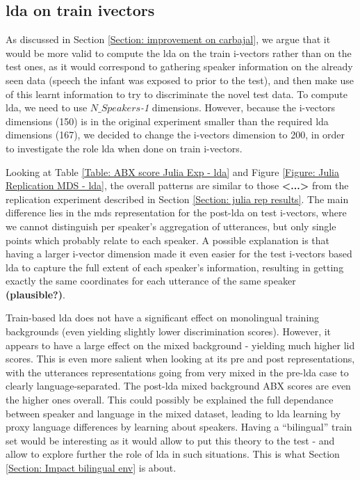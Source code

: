 \subsection{\acrshort{lda} on train ivectors} \label{Section: Julia rep exp - lda}

As discussed in Section \ref{Section: improvement on carbajal}, we argue that it would be more valid to compute the \acrshort{lda} on the train i-vectors rather than on the test ones, as it would correspond to gathering speaker information on the already seen data (speech the infant was exposed to prior to the test), and then make use of this learnt information to try to discriminate the novel test data. To compute \acrshort{lda}, we need to use $N\_Speakers$\textit{-1} dimensions. However, because the i-vectors dimensions (150) is in the original experiment smaller than the required \acrshort{lda} dimensions (167), we decided to change the i-vectors dimension to 200, in order to investigate the role \acrshort{lda} when done on train i-vectors. 

\par Looking at Table \ref{Table: ABX score Julia Exp - lda} and Figure \ref{Figure: Julia Replication MDS - lda}, the overall patterns are similar to those \textbf{<...>} from the replication experiment described in Section \ref{Section: julia rep results}. The main difference lies in the \acrshort{mds} representation for the post-\acrshort{lda} on test i-vectors, where we cannot distinguish per speaker's aggregation of utterances, but only single points which probably relate to each speaker. A possible explanation is that having a larger i-vector dimension made it even easier for the test i-vectors based \acrshort{lda} to capture the full extent of each speaker's information, resulting in getting exactly the same coordinates for each utterance of the same speaker \textbf{(plausible?)}.


\par Train-based \acrshort{lda} does not have a significant effect on monolingual training backgrounds (even yielding slightly lower discrimination scores). However, it appears to have a large effect on the mixed background - yielding much higher \acrshort{lid} scores.  This is even more salient when looking at its pre and post   representations, with the utterances representations going from very mixed in the pre-\acrshort{lda} case to clearly language-separated. The post-\acrshort{lda} mixed background ABX scores are even the higher ones overall. This could possibly be explained the full dependance between speaker and language in the mixed dataset, leading to \acrshort{lda} learning by proxy language differences by learning about speakers. Having a ``bilingual'' train set would be interesting as it would allow to put this theory to the test - and allow to explore further the role of \acrshort{lda} in such situations. This is what Section \ref{Section: Impact bilingual env} is about. 

